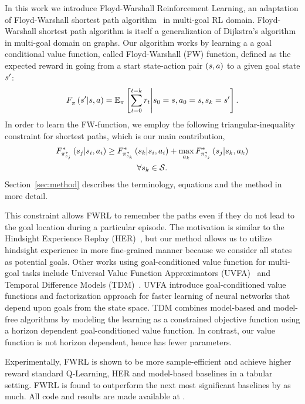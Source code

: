 In this work we introduce Floyd-Warshall Reinforcement Learning, an adaptation
of Floyd-Warshall shortest path algorithm~\citep{floydwarshall1962} in multi-goal
RL domain. Floyd-Warshall shortest path algorithm is itself a generalization of
Dijkstra's algorithm in multi-goal domain on graphs. Our algorithm works by learning a
a goal conditional value function, called Floyd-Warshall (FW) function, defined
as the expected reward in going from a start state-action pair $(\state, \act)$ to
a given goal state $\state'$:
%
\begin{align}
\fwargs{\state}{\act}{\state'}{\policy}{} =
\E_{\policy}\left[ \sum_{t=0}^{t=k} \rew_t \middle\vert \state_0 = \state, \act_0 = \state, \state_k = \state' \right] .
\end{align}%
%
In order to learn the FW-function, we employ the following triangular-inequality constraint for shortest paths, which is our main contribution,
%
\begin{multline}
\fwargs{\state_i}{\act_i}{\state_j}{\policy^*_{\state_j}}{*}
 \ge 
  \fwargs{\state_i}{\act_i}{\state_k}{\policy^*_{\state_k}}{*}
  + \max_{\act_k}\fwargs{\state_k}{\act_k}{\state_j}{\policy^*_{\state_j}}{*}
  \\
  \forall \state_k \in \State.
\end{multline}%
%
Section~\ref{sec:method} describes the terminology, equations and the method in more detail.

This constraint allows FWRL to remember the paths even if they do not lead to the goal
location during a particular episode. The motivation is similar to the Hindsight
Experience Replay (HER)~\citep{anderson2017vision}, but our method allows us to
utilize hindsight experience in more fine-grained manner because we consider all
states as potential goals. Other works using goal-conditioned value function for
multi-goal tasks include Universal Value Function Approximators
(UVFA)~\citep{schaul2015universal} and Temporal Difference Models
(TDM)~\citep{pong2018temporal}. UVFA introduce goal-conditioned value functions
and factorization approach for faster learning of neural networks that depend
upon goals from the state space. TDM combines model-based and model-free
algorithms by modeling the learning as a constrained objective function using a
horizon dependent goal-conditioned value function. In contrast, our value
function is not horizon dependent, hence has fewer parameters.


Experimentally, FWRL is shown to be more sample-efficient and achieve
higher reward standard Q-Learning, HER and model-based baselines in a
tabular setting.  FWRL is found to outperform the next most significant
baselines by as much. All code and results are made available at
\href{}{}. 





